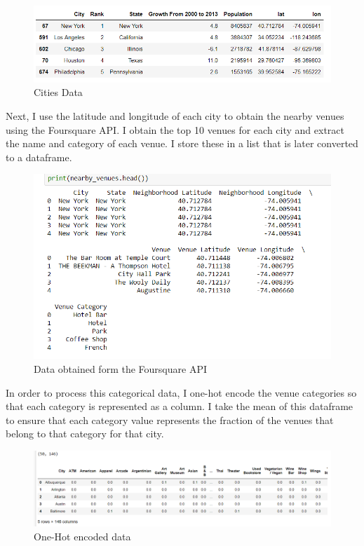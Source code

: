 \documentclass[12pt, a4paper]{report}
\begin{document}
\begin{figure}[H]
\includegraphics[]{cities_data}
\caption{Cities Data}
\end{figure}

Next, I use the latitude and longitude of each city to obtain the nearby venues using the Foursquare API. I obtain the top 10 venues for each city and extract the name and category of each venue. I store these in a list that is later converted to a dataframe. 

\begin{figure}[H]
	\includegraphics[]{foursquaredata}
	\caption{Data obtained form the Foursquare API}
\end{figure}

In order to process this categorical data, I one-hot encode the venue categories so that each category is represented as a column. I take the mean of this dataframe to ensure that each category value represents the fraction of the venues that belong to that category for that city. 

\begin{figure}[H]
	\includegraphics[width=500px]{one-hot}
	\caption{One-Hot encoded data}
\end{figure}
\end{document}
